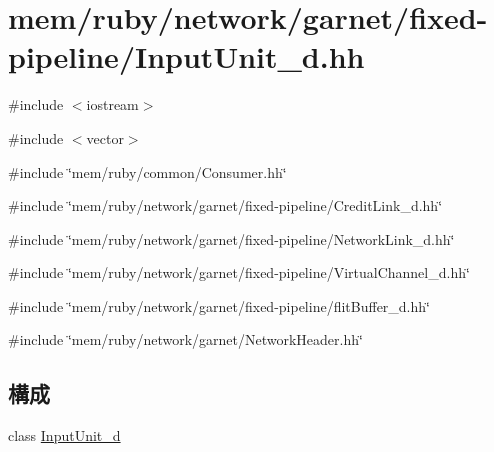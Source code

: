 \hypertarget{InputUnit__d_8hh}{
\section{mem/ruby/network/garnet/fixed-\/pipeline/InputUnit\_\-d.hh}
\label{InputUnit__d_8hh}
}
{\ttfamily \#include $<$iostream$>$}\par
{\ttfamily \#include $<$vector$>$}\par
{\ttfamily \#include \char`\"{}mem/ruby/common/Consumer.hh\char`\"{}}\par
{\ttfamily \#include \char`\"{}mem/ruby/network/garnet/fixed-\/pipeline/CreditLink\_\-d.hh\char`\"{}}\par
{\ttfamily \#include \char`\"{}mem/ruby/network/garnet/fixed-\/pipeline/NetworkLink\_\-d.hh\char`\"{}}\par
{\ttfamily \#include \char`\"{}mem/ruby/network/garnet/fixed-\/pipeline/VirtualChannel\_\-d.hh\char`\"{}}\par
{\ttfamily \#include \char`\"{}mem/ruby/network/garnet/fixed-\/pipeline/flitBuffer\_\-d.hh\char`\"{}}\par
{\ttfamily \#include \char`\"{}mem/ruby/network/garnet/NetworkHeader.hh\char`\"{}}\par
\subsection*{構成}
\begin{DoxyCompactItemize}
\item 
class \hyperlink{classInputUnit__d}{InputUnit\_\-d}
\end{DoxyCompactItemize}
